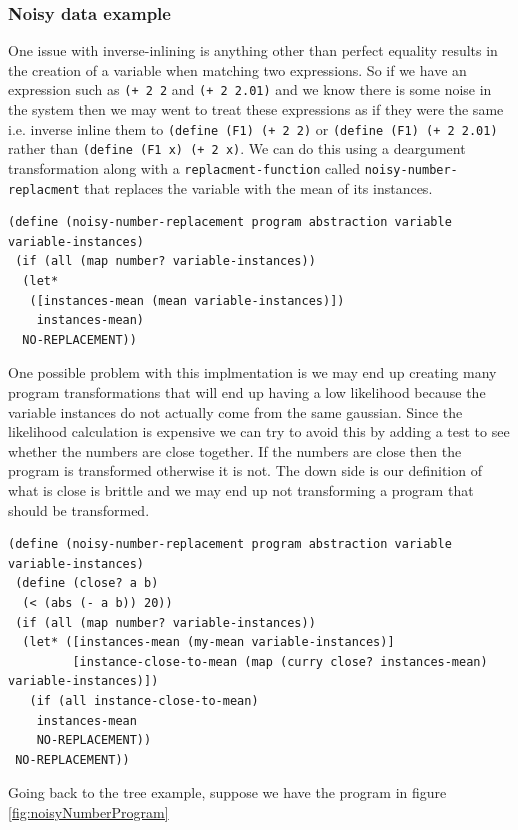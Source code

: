 \documentclass[a4paper,10pt]{article}
\begin{document}
\subsubsection{Noisy data example}
One issue with inverse-inlining is anything other than perfect equality results in the creation of a variable when matching two expressions.  So if we have an expression such as \texttt{(+ 2 2} and \texttt{(+ 2 2.01)} and we know there is some noise in the system then we may went to treat these expressions as if they were the same i.e. inverse inline them to \texttt{(define (F1) (+ 2 2)} or \texttt{(define (F1) (+ 2 2.01)} rather than \texttt{(define (F1 x) (+ 2 x)}.  We can do this using a deargument transformation along with a \texttt{replacment-function} called \texttt{noisy-number-replacment} that replaces the variable with the mean of its instances.  
\begin{lstlisting}[frame=trBL]
(define (noisy-number-replacement program abstraction variable variable-instances)
 (if (all (map number? variable-instances))
  (let* 
   ([instances-mean (mean variable-instances)])
    instances-mean)
  NO-REPLACEMENT))
\end{lstlisting}
One possible problem with this implmentation is we may end up creating many program transformations that will end up having a low likelihood because the variable instances do not actually come from the same gaussian.  Since the likelihood calculation is expensive we can try to avoid this by adding a test to see whether the numbers are close together.  If the numbers are close then the program is transformed otherwise it is not.  The down side is our definition of what is close is brittle and we may end up not transforming a program that should be transformed.
\begin{lstlisting}[frame=trBL]
(define (noisy-number-replacement program abstraction variable variable-instances)
 (define (close? a b)
  (< (abs (- a b)) 20))
 (if (all (map number? variable-instances))
  (let* ([instances-mean (my-mean variable-instances)]
         [instance-close-to-mean (map (curry close? instances-mean) variable-instances)])
   (if (all instance-close-to-mean)
    instances-mean
    NO-REPLACEMENT))
 NO-REPLACEMENT))
\end{lstlisting}

Going back to the tree example, suppose we have the program in figure \ref{fig:noisyNumberProgram}
\end{document}
